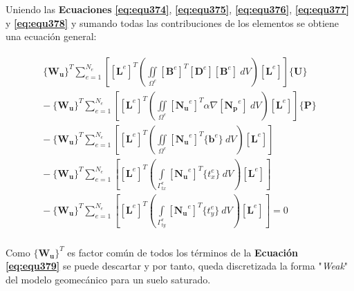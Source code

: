 \bigskip
Uniendo las \textbf{Ecuaciones} \textbf{\ref{eq:equ374}}, \textbf{\ref{eq:equ375}}, \textbf{\ref{eq:equ376}}, \textbf{\ref{eq:equ377}} y \textbf{\ref{eq:equ378}} y sumando todas las contribuciones de los elementos se obtiene una ecuación general:

\begin{ceqn} 
\begin{gather}\label{eq:equ379}
\begin{multlined}
 \{\mathbf{W_u}\}^T  \displaystyle\sum_{e=1}^{N_e} \left[ \left[\mathbf{L}^e\right]^T \left( \iint \limits_{\Omega^e}  [\mathbf{B}^e]^T [\mathbf{D}^e] [\mathbf{B}^e]\ dV \right) \left[\mathbf{L}^e\right] \right] \{\mathbf{U}\}\\[10pt]
-\ \{\mathbf{W_u}\}^T \displaystyle\sum_{e=1}^{N_e} \left[ \left[\mathbf{L}^e\right]^T \left( \iint \limits_{\Omega^e}  [\mathbf{N_u}^e]^T \alpha \nabla [\mathbf{N_p}^e]\ dV \right) \left[\mathbf{L}^e\right] \right] \{\mathbf{P}\} \\[10pt]
-\ \{\mathbf{W_u}\}^T \displaystyle\sum_{e=1}^{N_e} \left[ \left[\mathbf{L}^e\right]^T \left( \iint \limits_{\Omega^e}  [\mathbf{N_u}^e]^T  \{\mathbf{b}^e\}\ dV \right) \left[\mathbf{L}^e\right] \right] \\[10pt]
-\ \{\mathbf{W_u}\}^T \displaystyle\sum_{e=1}^{N_e} \left[ \left[\mathbf{L}^e\right]^T \left( \int \limits_{\Gamma^e_{tx}} [\mathbf{N_u}^e]^T  \{t^e_x\}\ dV \right) \left[\mathbf{L}^e\right] \right] \\[10pt]
-\ \{\mathbf{W_u}\}^T \displaystyle\sum_{e=1}^{N_e} \left[ \left[\mathbf{L}^e\right]^T \left( \int \limits_{\Gamma^e_{ty}} [\mathbf{N_u}^e]^T  \{t^e_y\}\ dV \right) \left[\mathbf{L}^e\right] \right]  = 0 \\[10pt]
\end{multlined}
\end{gather}  
\end{ceqn}

Como $\{\mathbf{W_u}\}^T$ es factor común de todos los términos de la \textbf{Ecuación} \textbf{\ref{eq:equ379}} se puede descartar y por tanto, queda discretizada la forma "\textit{Weak}" del modelo geomecánico para un suelo saturado.
\newpage


